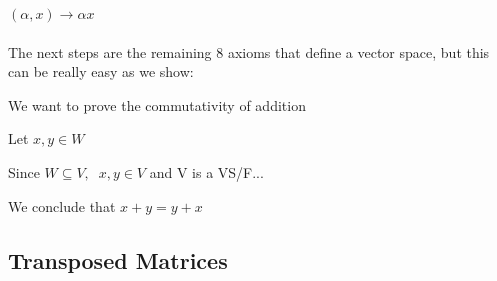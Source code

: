 \documentclass{article}
\begin{document}
\((\alpha,x) \rightarrow \alpha x\)
\\
\\
The next steps are the remaining 8 axioms that define a vector space, but this can be really easy as we show:

We want to prove the commutativity of addition

Let \(x,y \in W\) 

Since \(W \subseteq V,\;\; x,y \in V\) and V is a VS/F...

We conclude that \(x+y=y+x\)

\subsection*{Transposed Matrices}
\end{document}
